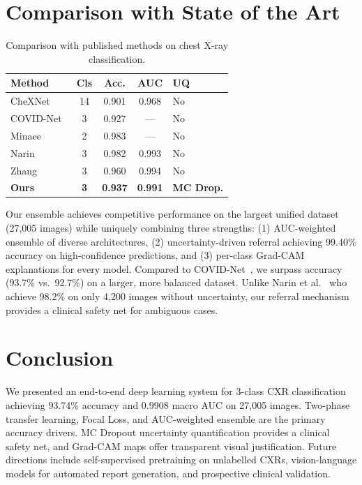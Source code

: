 \documentclass{article}
\begin{document}
\section{Comparison with State of the Art}
\label{sec:sota}

\begin{table}[h]
\centering
\caption{Comparison with published methods on chest X-ray classification.}
\label{tab:sota}
\small
\begin{tabular}{p{2.0cm}ccc p{1.3cm}}
\toprule
\textbf{Method} & \textbf{Cls} & \textbf{Acc.} & \textbf{AUC} & \textbf{UQ}\\
\midrule
CheXNet~\cite{rajpurkar2017}  & 14 & 0.901 & 0.968 & No\\
COVID-Net~\cite{wang2020}     & 3  & 0.927 & ---   & No\\
Minaee~\cite{minaee2020}      & 2  & 0.983 & ---   & No\\
Narin~\cite{narin2021}        & 3  & 0.982 & 0.993 & No\\
Zhang~\cite{zhang2020}        & 3  & 0.960 & 0.994 & No\\
\midrule
\textbf{Ours}  & \textbf{3} & \textbf{0.937} & \textbf{0.991} & \textbf{MC Drop.}\\
\bottomrule
\end{tabular}
\end{table}

Our ensemble achieves competitive performance on the largest unified dataset
(27{,}005 images) while uniquely combining three strengths: (1) AUC-weighted ensemble
of diverse architectures, (2) uncertainty-driven referral achieving 99.40\% accuracy
on high-confidence predictions, and (3) per-class Grad-CAM explanations for every
model. Compared to COVID-Net~\cite{wang2020}, we surpass accuracy (93.7\% vs.\ 92.7\%)
on a larger, more balanced dataset. Unlike Narin et al.~\cite{narin2021} who achieve
98.2\% on only 4{,}200 images without uncertainty, our referral mechanism provides a
clinical safety net for ambiguous cases.

\section{Conclusion}
\label{sec:conclusion}

We presented an end-to-end deep learning system for 3-class CXR classification
achieving 93.74\% accuracy and 0.9908 macro AUC on 27{,}005 images. Two-phase
transfer learning, Focal Loss, and AUC-weighted ensemble are the primary accuracy
drivers. MC Dropout uncertainty quantification provides a clinical safety net, and
Grad-CAM maps offer transparent visual justification. Future directions include
self-supervised pretraining on unlabelled CXRs, vision-language models for automated
report generation, and prospective clinical validation.
\end{document}
